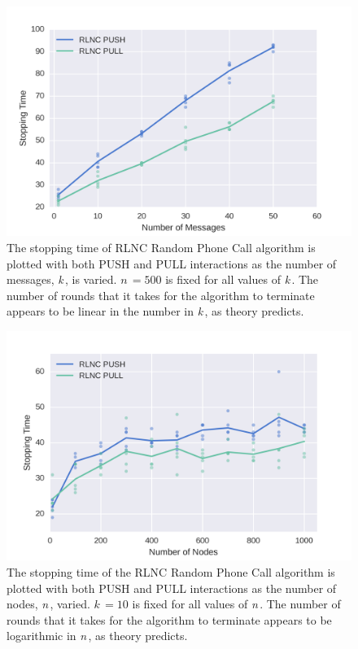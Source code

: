 \documentclass{article} %
\def\numNodes{\textit{n}\,}
\def\numMessages{\textit{k}\,}
\begin{document}
\begin{figure}
	\centering
	\includegraphics[width=\linewidth]{figures/rlnc-vary-k.png}
	\caption{The stopping time of RLNC Random Phone Call algorithm is plotted with both PUSH and PULL interactions as the number of messages, \numMessages, is varied. $\numNodes=500$ is fixed for all values of \numMessages. The number of rounds that it takes for the algorithm to terminate appears to be linear in the number in \numMessages, as theory predicts.}
	\label{fig:rlnc-vary-k}
\end{figure} 
\begin{figure}
	\centering
	\includegraphics[width=\linewidth]{figures/rlnc-vary-n.png}
	\caption{The stopping time of the RLNC Random Phone Call algorithm is plotted with both PUSH and PULL interactions as the number of nodes, \numNodes, varied. $\numMessages=10$ is fixed for all values of \numNodes. The number of rounds that it takes for the algorithm to terminate appears to be logarithmic in \numNodes, as theory predicts.}
	\label{fig:rlnc-vary-n}
\end{figure} 
\end{document}
